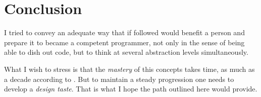 \section{Conclusion}

I tried to convey an adequate way that if followed would benefit a person and
prepare it to became a competent programmer, not only in the sense of being able
to dish out code, but to think at several abstraction levels simultaneously. 

What I wish to stress is that the \emph{mastery} of this concepts takes
time\cite{programming:chamond__sod}, as much as a decade according to
\cite{education:norvig__teach_yourself_programming}. But to maintain a steady
progression one needs to develop a \emph{design taste}. That is what I hope the
path outlined here would provide.
